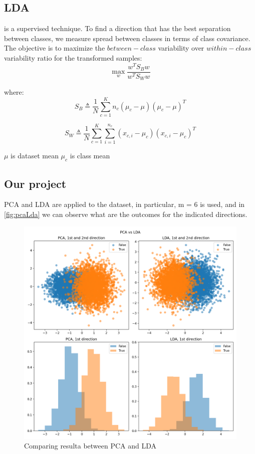 
\subsection{LDA}
\label{subsec:LDA} is a supervised technique.
To find a direction that has the best separation between classes, we measure spread between classes in terms of class covariance.
The objective is to maximize the \(between-class\) variability over \(within-class\) variability ratio for the transformed samples:
\begin{equation}
    \underset{w}{\max} \frac{w^T S_B w}{w^T S_W w}
    \label{eq:ldaFunct}
\end{equation}

where:
\begin{equation}
    S_B  \triangleq \frac{1}{N}\sum_{c=1}^{K} n_c (\mu_c - \mu)(\mu_c - \mu)^T
    \label{eq:betweenClass}
\end{equation}

\begin{equation}
    S_W \triangleq \frac{1}{N}\sum_{c=1}^{K} \sum_{i=1}^{n_c} (x_{c,i} - \mu_c)(x_{c,i} - \mu_c)^T
    \label{eq:withinClass}
\end{equation}

\(\mu\) is dataset mean
\(\mu_{c}\) is class mean


\subsection{Our project}
\label{subsec:ourProject}
PCA and LDA are applied to the dataset, in particular, m = 6 is used, and in \autoref{fig:pcaLda} we can observe
what are the outcomes for the indicated directions.

\begin{figure}[h]
    \centering
    \includegraphics[width=0.5\linewidth]{Lab/03. Lab 03/Images/02. PVA_LDA}
    \caption{Comparing resulta between PCA and LDA}
    \label{fig:pcaLda}
\end{figure}

